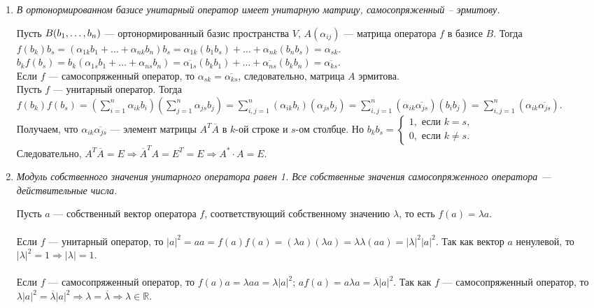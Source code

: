 \begin{enumerate}
	\item \textit{В ортонормированном базисе унитарный оператор имеет унитарную матрицу, самосопряженный – эрмитову.}\begin{Proof} Пусть $B(b_1,\dots,b_n)$ --- ортонормированный базис пространства $V$, $A(\alpha_{ij})$ --- матрица оператора $f$ в базисе $B$. Тогда \\$f(b_k)b_s = (\alpha_{1k}b_1 + \ldots + \alpha_{nk}b_n)b_s = \alpha_{1k} (b_1 b_s ) + \ldots + \alpha_{nk} (b_n b_s) = \alpha_{sk}$.\\
		$b_k f(b_s) = b_k(\alpha_{1s}b_1 + \ldots + \alpha_{ns}b_n) = \overline{\alpha_{1s}}(b_kb_1)+ \ldots +\overline{\alpha_{ns}}(b_k b_n) = \overline{\alpha_{ks}}$.\\
		Если $f$ --- самосопряженный оператор, то $\alpha_{sk} = \overline{\alpha_{ks}}$, следовательно, матрица $A$ эрмитова.\\ Пусть $f$ --- унитарный оператор. Тогда\\
		$f(b_k)f(b_s) = (\sum\limits_{i=1}^{n}{\alpha_{ik}b_i})(\sum\limits_{j=1}^{n}{\alpha_{js}b_j}) = \sum\limits_{i,j=1}^{n}{(\alpha_{ik}b_i)(\alpha_{js}b_j)}=\sum\limits_{i,j=1}^{n}{(\alpha_{ik}\overline{\alpha_{js}})(b_ib_j)} = \sum\limits_{i,j=1}^{n}(\alpha_{ik}\overline{\alpha_{js}})$.\\	Получаем, что $\alpha_{ik}\overline{\alpha_{js}}$ --- элемент матрицы $A^T\overline{A}$ в $k$-ой строке и $s$-ом столбце. Но $b_kb_s = \begin{cases}
			1, \text{ если } k=s,\\
			0, \text{ если } k\ne s.	\end{cases}$\\ Следовательно, $A^T\overline{A} = E\Rightarrow \overline{A}^T A = E^T = E\Rightarrow A^*\cdot A = E$.\end{Proof}
	\item \textit{Модуль собственного значения унитарного оператора равен 1. Все
		собственные значения самосопряженного оператора --- действительные	числа.}\begin{Proof}
		Пусть $a$ --- собственный вектор оператора $f$, соответствующий собственному значению $\lambda$, то есть $f(a) = \lambda a$. \\\\Если $f$ --- унитарный оператор, то $|a|^2 = a a = f(a)f(a) = (\lambda a)(\lambda a) = \lambda\lambda(aa) = |\lambda|^2|a|^2$.
		Так как вектор $a$ ненулевой, то $|\lambda|^2 = 1 \Rightarrow |\lambda| = 1$.\\\\
		Если $f$ --- самосопряженный оператор, то $f(a) a = \lambda a a = \lambda |a|^2;\, af(a) = a\lambda a =  \overline{\lambda} |a|^2$. Так как $f$ --- самосопряженный оператор, то $\lambda|a|^2 = \overline{\lambda} |a|^2\Rightarrow \lambda = \overline{\lambda}\Rightarrow\lambda\in\mathbb{R}$.
	\end{Proof}
\end{enumerate}
